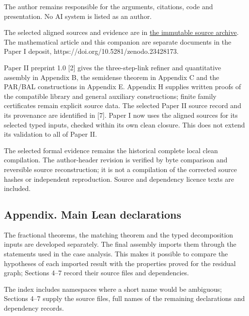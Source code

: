 \documentclass[english,11pt,a4paper]{article}
\begin{document}
The author remains responsible for the arguments, citations, code and presentation. No AI system is listed as an author.

The selected aligned sources and evidence are in \href{https://github.com/jtraverso/nash-williams-triangle-decompositions-release/blob/0d652cde7d8d1f58cb6dd264b30fd3e6dc60f4f7/archives/PAPER_I_LEAN_20261020_ALIGNED_v3.zip}{the immutable source archive}. The mathematical article and this companion are separate documents in the Paper I deposit, https://doi.org/10.5281/zenodo.23428173.

Paper II preprint 1.0 {[}2{]} gives the three-step-link refiner and quantitative assembly in Appendix B, the semidense theorem in Appendix C and the PAR/BAL constructions in Appendix E. Appendix H supplies written proofs of the compatible library and general auxiliary constructions; finite family certificates remain explicit source data. The selected Paper II source record and its provenance are identified in {[}7{]}. Paper I now uses the aligned sources for its selected typed inputs, checked within its own clean closure. This does not extend its validation to all of Paper II.

The selected formal evidence remains the historical complete local clean compilation. The author-header revision is verified by byte comparison and reversible source reconstruction; it is not a compilation of the corrected source hashes or independent reproduction. Source and dependency licence texts are included.

\subsection{Appendix. Main Lean declarations}\label{appendix.-main-lean-declarations}

The fractional theorems, the matching theorem and the typed decomposition inputs are developed separately. The final assembly imports them through the statements used in the case analysis. This makes it possible to compare the hypotheses of each imported result with the properties proved for the residual graph; Sections 4--7 record their source files and dependencies.

The index includes namespaces where a short name would be ambiguous; Sections 4--7 supply the source files, full names of the remaining declarations and dependency records.
\end{document}
